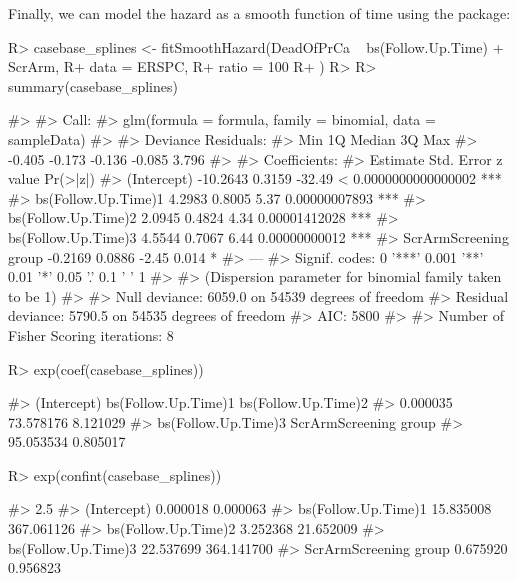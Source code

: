 \documentclass[
]{jss}
\begin{document}
Finally, we can model the hazard as a smooth function of time using the
 package:

\begin{CodeChunk}

\begin{CodeInput}
R> casebase_splines <- fitSmoothHazard(DeadOfPrCa ~ bs(Follow.Up.Time) + ScrArm,
R+   data = ERSPC,
R+   ratio = 100
R+ )
R> 
R> summary(casebase_splines)
\end{CodeInput}

\begin{CodeOutput}
#> 
#> Call:
#> glm(formula = formula, family = binomial, data = sampleData)
#> 
#> Deviance Residuals: 
#>    Min      1Q  Median      3Q     Max  
#> -0.405  -0.173  -0.136  -0.085   3.796  
#> 
#> Coefficients:
#>                       Estimate Std. Error z value             Pr(>|z|)    
#> (Intercept)           -10.2643     0.3159  -32.49 < 0.0000000000000002 ***
#> bs(Follow.Up.Time)1     4.2983     0.8005    5.37        0.00000007893 ***
#> bs(Follow.Up.Time)2     2.0945     0.4824    4.34        0.00001412028 ***
#> bs(Follow.Up.Time)3     4.5544     0.7067    6.44        0.00000000012 ***
#> ScrArmScreening group  -0.2169     0.0886   -2.45                0.014 *  
#> ---
#> Signif. codes:  0 '***' 0.001 '**' 0.01 '*' 0.05 '.' 0.1 ' ' 1
#> 
#> (Dispersion parameter for binomial family taken to be 1)
#> 
#>     Null deviance: 6059.0  on 54539  degrees of freedom
#> Residual deviance: 5790.5  on 54535  degrees of freedom
#> AIC: 5800
#> 
#> Number of Fisher Scoring iterations: 8
\end{CodeOutput}

\begin{CodeInput}
R> exp(coef(casebase_splines))
\end{CodeInput}

\begin{CodeOutput}
#>           (Intercept)   bs(Follow.Up.Time)1   bs(Follow.Up.Time)2 
#>              0.000035             73.578176              8.121029 
#>   bs(Follow.Up.Time)3 ScrArmScreening group 
#>             95.053534              0.805017
\end{CodeOutput}

\begin{CodeInput}
R> exp(confint(casebase_splines))
\end{CodeInput}

\begin{CodeOutput}
#>                           2.5 %
#> (Intercept)            0.000018   0.000063
#> bs(Follow.Up.Time)1   15.835008 367.061126
#> bs(Follow.Up.Time)2    3.252368  21.652009
#> bs(Follow.Up.Time)3   22.537699 364.141700
#> ScrArmScreening group  0.675920   0.956823
\end{CodeOutput}
\end{CodeChunk}
\end{document}
